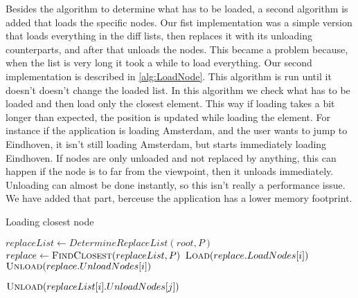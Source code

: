 Besides the algorithm to determine what has to be loaded, a second algorithm is added that loads the specific nodes. Our fist implementation was a simple version that loads everything in the diff lists, then replaces it with its unloading counterparts, and after that unloads the nodes. This became a problem because, when the list is very long it took a while to load everything. Our second implementation is described in \ref{alg:LoadNode}. This algorithm is run until it doesn't doesn't change the loaded list. In this algorithm we check what has to be loaded and then load only the closest element. This way if loading takes a bit longer than expected, the position is updated while loading the element. For instance if the application is loading Amsterdam, and the user wants to jump to Eindhoven, it isn't still loading Amsterdam, but starts immediately loading Eindhoven. If nodes are only unloaded and not replaced by anything, this can happen if the node is to far from the viewpoint, then it unloads immediately. Unloading can almost be done instantly, so this isn't really a performance issue. We have added that part, berceuse the application has a lower memory footprint.

\begin{algorithm}[h]
\caption{Loading closest node}\label{alg:LoadNode}
\begin{algorithmic}[1]
 
    \State $replaceList \gets DetermineReplaceList(root, P)$
        \State $replace \gets \Call{FindClosest}{replaceList, P}$
            \State $\Call{Load}{replace.LoadNodes[i]}$
        \EndFor
            \State $\Call{Unload}{replace.UnloadNodes[i]}$
        \EndFor
        
                    \State $\Call{Unload}{replaceList[i].UnloadNodes[j]}$
                \EndFor
            \EndIf
        \EndFor
    \EndIf
\EndProcedure
\end{algorithmic}
\end{algorithm}